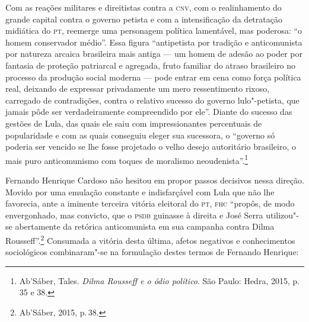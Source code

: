 Com as reações militares e direitistas contra a \textsc{cnv}, com o realinhamento
do grande capital contra o governo petista e com a intensificação da
detratação midiática do \textsc{pt}, reemerge uma personagem política lamentável,
mas poderosa: ``o homem conservador médio''. Essa figura ``antipetista
por tradição e anticomunista por natureza arcaica brasileira mais antiga
--- um homem de adesão ao poder por fantasia de proteção patriarcal e
agregada, fruto familiar do atraso brasileiro no processo da produção
social moderna --- pode entrar em cena como força política real, deixando
de expressar privadamente um mero ressentimento rixoso, carregado de
contradições, contra o relativo sucesso do governo lulo"-petista, que
jamais pôde ser verdadeiramente compreendido por ele''. Diante do
sucesso das gestões de Lula, das quais ele saiu com impressionantes
percentuais de popularidade e com as quais conseguiu eleger sua
sucessora, o ``governo só poderia ser vencido se lhe fosse projetado o
velho desejo autoritário brasileiro, o mais puro anticomunismo com
toques de moralismo neoudenista''.\footnote{Ab'Sáber, Tales. \emph{Dilma
  Rousseff e o ódio político}. São Paulo: Hedra, 2015, p.\,35 e 38.}

Fernando Henrique Cardoso não hesitou em propor passos decisivos nessa
direção. Movido por uma emulação constante e indisfarçável com Lula que
não lhe favorecia, ante a iminente terceira vitória eleitoral do \textsc{pt}, \textsc{fhc}
``propôs, de modo envergonhado, mas convicto, que o \textsc{psdb} guinasse à
direita e José Serra utilizou"-se abertamente da retórica anticomunista
em sua campanha contra Dilma Rousseff''.\footnote{Ab'Sáber, 2015, p.\,38.}
Consumada a vitória desta última, afetos negativos e conhecimentos
sociológicos combinaram"-se na formulação destes termos de Fernando
Henrique:

